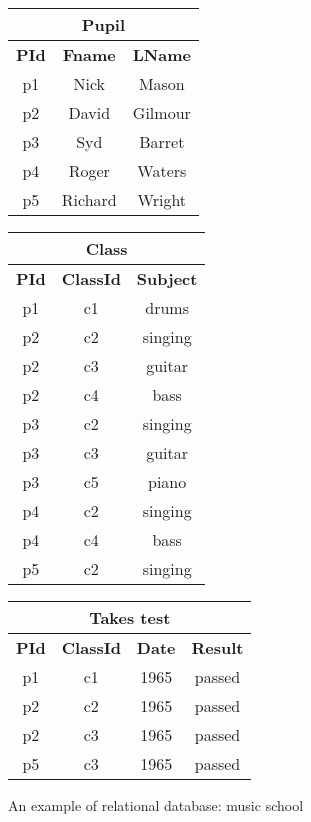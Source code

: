 \begin{figure}[htb]
        
        \begin{tabular}{|c c c|}
            \multicolumn{3}{c}{\textbf{Pupil}}\\
      \hline
            \textbf{PId} & \textbf{Fname} & \textbf{LName}\\ \hline
        p1 &  Nick  & Mason\\
        p2 &  David & Gilmour\\
        p3 &  Syd   & Barret\\
        p4 &  Roger & Waters\\
        p5 &  Richard & Wright \\\hline
    \end{tabular}
     \hfill
        \begin{tabular}{|c c c|}
            \multicolumn{3}{c}{\textbf{Class}}\\
      \hline
            \textbf{PId} & \textbf{ClassId} & \textbf{Subject}\\ \hline
       p1 & c1& drums \\
       p2 & c2& singing \\
       p2 & c3& guitar\\
       p2 & c4& bass \\
       p3 & c2& singing\\
       p3 & c3& guitar\\
       p3 & c5& piano\\
       p4 & c2& singing\\
       p4 & c4& bass\\
       p5 & c2& singing \\\hline
        \end{tabular}
        \hfill
        \begin{tabular}{|c c c c|}
            \multicolumn{4}{c}{\textbf{Takes test}}\\
      \hline
            \textbf{PId} & \textbf{ClassId} & \textbf{Date} &
            \textbf{Result}\\ \hline
            p1 & c1 & 1965 & passed\\
            p2 & c2 & 1965 & passed\\
            p2 & c3 & 1965 & passed\\
            p5 & c3 & 1965 & passed\\\hline
    \end{tabular}
    \caption{An example of relational database: music school}
    \label{fig:relational_database_school}
    \end{figure}


